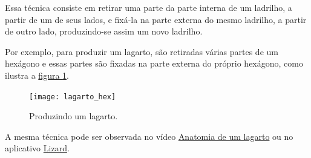 Essa técnica consiste em retirar uma parte da parte interna de um ladrilho, a partir de um de seus lados, e fixá-la na parte externa do mesmo ladrilho, a partir de outro lado, produzindo-se assim um novo ladrilho.

Por exemplo, para produzir um lagarto, são retiradas várias partes de um hexágono e essas partes são fixadas na parte externa do próprio hexágono, como ilustra a \hyperref[lagarto_hex]{figura \ref{lagarto_hex}}.


 \begin{figure}[H]
	\centering
	\texttt{[image: lagarto\_hex]}
	\caption{Produzindo um lagarto.}
	\label{lagarto_hex}
\end{figure}

A mesma técnica pode ser observada no vídeo \href{ https://youtu.be/T6L6bE_bTMo}{Anatomia de um lagarto} ou no  aplicativo \href{https://www.geogebra.org/m/zs2ud4w5} {Lizard}.


\needspace{.2\textheight}
\def\currentcolor{session2}


